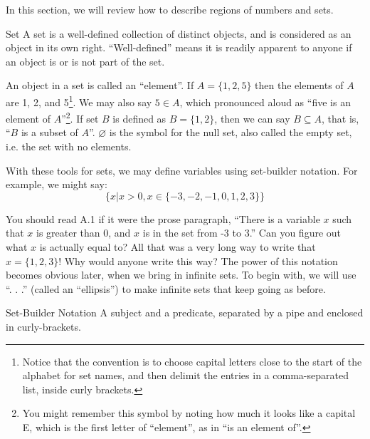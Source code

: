 
\label{sec:Sets}



In this section, we will review how to describe regions of numbers and sets.

\begin{derivation}{Set}
A \gls{set} is a well-defined collection of distinct objects, and is considered as an 
object in its own right.  ``Well-defined''
means it is readily apparent to anyone if an object is or is not part of the set.
\end{derivation}

An object in a set is called an ``element''.  If $A = \{1, 2, 5\}$ then the 
elements of $A$ are 1, 2, and 5\footnote{Notice that the convention is to
choose capital letters close to the start of the alphabet for set names, and then
delimit the entries in a comma-separated list, inside curly brackets.}.  We may
also say $5 \in A$, which pronounced aloud as ``five is an element 
of $A$''\footnote{You might remember this symbol
by noting how much it looks like a capital E, which is the first letter 
of ``element'', as in ``is an element of''.}.  If set $B$ is
defined as $B=\{1,2\}$, then we can say $B \subseteq A$, that is, ``$B$ is a 
subset of $A$''.  $\varnothing$ is the symbol for the 
null set, also called the empty set, i.e. the set with no elements.

With these tools for sets, we may define variables using \gls{set-builder notation}.  
For example, we might say:
\begin{equation}
\{ x | x > 0, x \in \{-3, -2, -1, 0, 1, 2, 3\}\}
\end{equation}


You should read A.1 if it were the prose paragraph, ``There is a variable $x$ such 
that $x$ is greater than 0, 
and $x$ is in the set from -3 to 3.''  Can you figure out what $x$ is actually equal to?  
All that was a very 
long way to write that $x = \{1,2,3\}$!  Why would anyone write this way?  
The power of this notation becomes
obvious later, when we bring in infinite sets.  To begin with, we will use ``. . .'' 
(called an ``ellipsis'') to make infinite sets that keep going as before.


\begin{derivation}{Set-Builder Notation}
A subject and a predicate, separated by a pipe and enclosed in curly-brackets.
\end{derivation}


